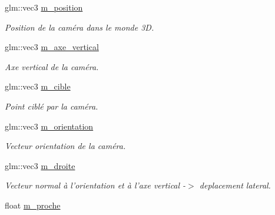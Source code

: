 \begin{DoxyCompactItemize}
\item 
\hypertarget{classAbstractCamera_a0a7cf1e2ab478c3b2a375fdd8d298cdc}{glm\+::vec3 \hyperlink{classAbstractCamera_a0a7cf1e2ab478c3b2a375fdd8d298cdc}{m\+\_\+position}}\label{classAbstractCamera_a0a7cf1e2ab478c3b2a375fdd8d298cdc}

\begin{DoxyCompactList}\small\item\em Position de la caméra dans le monde 3\+D. \end{DoxyCompactList}\item 
\hypertarget{classAbstractCamera_a9809fe9917c78f701bbda73a116b11cb}{glm\+::vec3 \hyperlink{classAbstractCamera_a9809fe9917c78f701bbda73a116b11cb}{m\+\_\+axe\+\_\+vertical}}\label{classAbstractCamera_a9809fe9917c78f701bbda73a116b11cb}

\begin{DoxyCompactList}\small\item\em Axe vertical de la caméra. \end{DoxyCompactList}\item 
\hypertarget{classAbstractCamera_aee9a00d7b11559a5448abbfa751a6d96}{glm\+::vec3 \hyperlink{classAbstractCamera_aee9a00d7b11559a5448abbfa751a6d96}{m\+\_\+cible}}\label{classAbstractCamera_aee9a00d7b11559a5448abbfa751a6d96}

\begin{DoxyCompactList}\small\item\em Point ciblé par la caméra. \end{DoxyCompactList}\item 
\hypertarget{classAbstractCamera_a16b6278ac154b9869c605131bab89d74}{glm\+::vec3 \hyperlink{classAbstractCamera_a16b6278ac154b9869c605131bab89d74}{m\+\_\+orientation}}\label{classAbstractCamera_a16b6278ac154b9869c605131bab89d74}

\begin{DoxyCompactList}\small\item\em Vecteur orientation de la caméra. \end{DoxyCompactList}\item 
\hypertarget{classAbstractCamera_a67b386323421b56e7e123d74c0d8e990}{glm\+::vec3 \hyperlink{classAbstractCamera_a67b386323421b56e7e123d74c0d8e990}{m\+\_\+droite}}\label{classAbstractCamera_a67b386323421b56e7e123d74c0d8e990}

\begin{DoxyCompactList}\small\item\em Vecteur normal à l'orientation et à l'axe vertical -\/$>$ deplacement lateral. \end{DoxyCompactList}\item 
\hypertarget{classAbstractCamera_a302613d43b644880473e964ede5c6094}{float \hyperlink{classAbstractCamera_a302613d43b644880473e964ede5c6094}{m\+\_\+proche}}\label{classAbstractCamera_a302613d43b644880473e964ede5c6094}


\end{DoxyCompactItemize}

